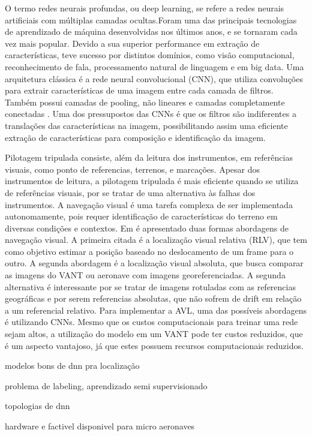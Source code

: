 
O termo redes neurais profundas, ou deep learning, se refere a redes neurais artificiais com múltiplas camadas ocultas.Foram uma das principais tecnologias de aprendizado de máquina desenvolvidas nos últimos anos, e se tornaram cada vez mais popular. Devido a sua superior performance em extração de características, teve sucesso por distintos domínios, como visão computacional, reconhecimento de fala, processamento natural de linguagem e em big data. Uma arquitetura clássica é a rede neural convolucional (CNN), que utiliza convoluções para extrair características de uma imagem entre cada camada de filtros. Também possui camadas de pooling, não lineares e camadas completamente conectadas \cite{8308186}. Uma dos pressupostos das CNNs é que os filtros são indiferentes a translações das características na imagem, possibilitando assim uma eficiente extração de características para composição e identificação da imagem.


Pilotagem tripulada consiste, além da leitura dos instrumentos, em referências visuais, como ponto de referencias, terrenos, e marcações. Apesar dos instrumentos de leitura, a pilotagem tripulada é mais eficiente quando se utiliza de referências visuais, por se tratar de uma alternativa às falhas dos instrumentos. A navegação visual é uma tarefa complexa de ser implementada autonomamente, pois requer identificação de características do terreno em diversas condições e contextos. Em \cite{COUTURIER2021103666} é apresentado duas formas abordagens de navegação visual. A primeira citada é a localização visual relativa (RLV), que tem como objetivo estimar a posição baseado no deslocamento de um frame para o outro. A segunda abordagem é a localização visual absoluta, que busca comparar as imagens do VANT ou aeronave com imagens georeferenciadas. A segunda alternativa é interessante por se tratar de imagens rotuladas com as referencias geográficas e por serem referencias absolutas, que não sofrem de drift em relação a um referencial relativo. Para implementar a AVL, uma das possíveis abordagens é utilizando CNNs. Mesmo que os custos computacionais para treinar uma rede sejam altos, a utilização do modelo em um VANT pode ter custos reduzidos, que é um aspecto vantajoso, já que estes possuem recursos computacionais reduzidos.

modelos bons de dnn pra localização 


problema de labeling, aprendizado semi supervisionado

topologias de dnn 

hardware e factivel disponivel para micro aeronaves 

